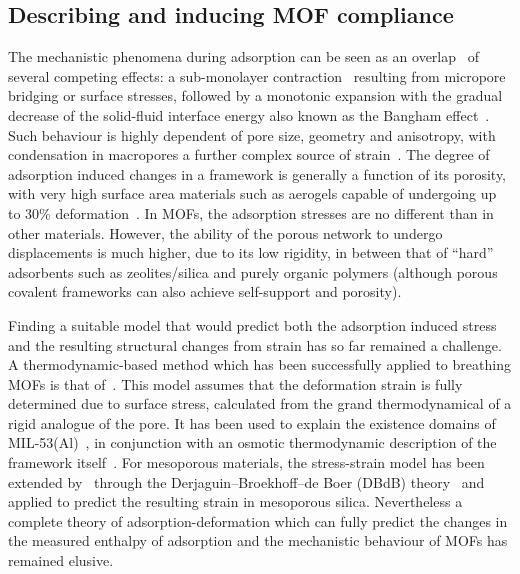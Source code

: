 \subsection{Describing and inducing MOF compliance}

The mechanistic phenomena during adsorption can be 
seen as an overlap~\cite{gorAdsorptionInducedDeformationMesoporous2010}
of several competing effects: a sub-monolayer
contraction~\cite{daceyVolumeChangesSaran1971} resulting
from micropore bridging or surface stresses, followed by a monotonic 
expansion with the gradual decrease of the solid-fluid interface energy
also known as the Bangham 
effect~\cite{banghamExpansionCharcoalAccompanying1928}. 
Such behaviour is highly dependent of pore size, geometry and anisotropy,
with condensation in macropores a further complex source of 
strain~\cite{dolinoAdsorptionStrainsPorous1996, %
ambergSTUDYADSORPTIONHYSTERESIS1952, %
guntherNovelInsightsNanopore2008}. The degree of adsorption induced
changes in a framework is generally a function of its porosity, 
with very high 
surface area materials such as aerogels capable of undergoing up 
to 30\% deformation~\cite{reichenauerNitrogenSorptionAerogels2001}.
In MOFs, the adsorption stresses are no different than in other 
materials. However, the ability of the porous network to undergo
displacements is much higher, due to its low rigidity, in 
between that of ``hard'' adsorbents such as zeolites/silica and 
purely organic polymers (although porous covalent frameworks can
also achieve self-support and porosity).

Finding a suitable model that would predict both the adsorption
induced stress and the resulting structural changes from strain
has so far remained a challenge. A thermodynamic-based method which
has been successfully applied to breathing MOFs is that 
of~\citet{neimarkStressBasedModelBreathing2010}. This model assumes
that the deformation strain is fully determined due to surface stress,
calculated from the grand thermodynamical of a rigid analogue of
the pore. It has been used to explain the existence 
domains of MIL-53(Al)~\cite{boutinBehaviorFlexibleMIL532010}, in 
conjunction with an osmotic thermodynamic description of 
the framework itself~\cite{coudertThermodynamicsGuestInducedStructural2008}.
For mesoporous materials, the stress-strain model has been extended 
by~\citet{gorAdsorptionInducedDeformationMesoporous2010} through
the Derjaguin–Broekhoff–de Boer (DBdB) 
theory~\cite{broekhoffStudiesPoreSystems1967} and applied to
predict the resulting strain in mesoporous silica.
Nevertheless a complete theory of adsorption-deformation 
which can fully predict the changes in the measured enthalpy of 
adsorption and the mechanistic behaviour of MOFs has remained elusive.

